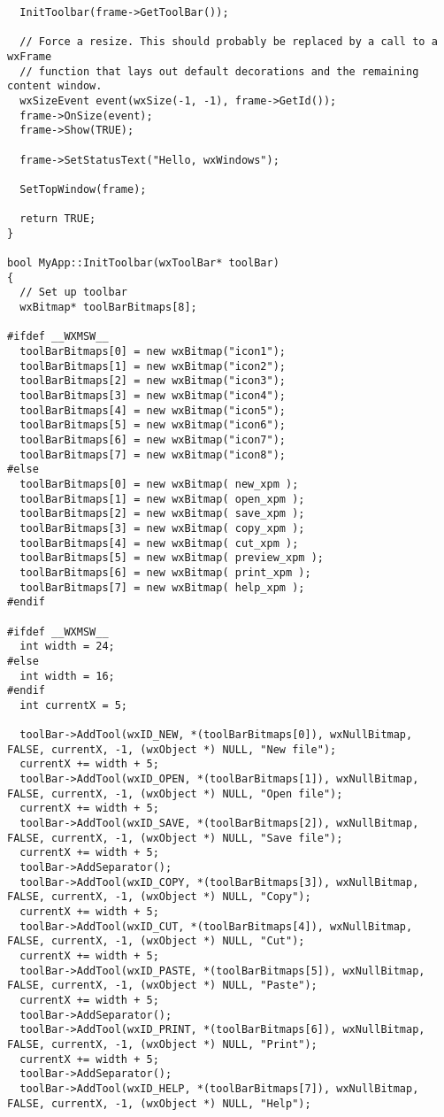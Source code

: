 {\begin{verbatim}
  InitToolbar(frame->GetToolBar());

  // Force a resize. This should probably be replaced by a call to a wxFrame
  // function that lays out default decorations and the remaining content window.
  wxSizeEvent event(wxSize(-1, -1), frame->GetId());
  frame->OnSize(event);
  frame->Show(TRUE);

  frame->SetStatusText("Hello, wxWindows");
  
  SetTopWindow(frame);

  return TRUE;
}

bool MyApp::InitToolbar(wxToolBar* toolBar)
{
  // Set up toolbar
  wxBitmap* toolBarBitmaps[8];

#ifdef __WXMSW__
  toolBarBitmaps[0] = new wxBitmap("icon1");
  toolBarBitmaps[1] = new wxBitmap("icon2");
  toolBarBitmaps[2] = new wxBitmap("icon3");
  toolBarBitmaps[3] = new wxBitmap("icon4");
  toolBarBitmaps[4] = new wxBitmap("icon5");
  toolBarBitmaps[5] = new wxBitmap("icon6");
  toolBarBitmaps[6] = new wxBitmap("icon7");
  toolBarBitmaps[7] = new wxBitmap("icon8");
#else
  toolBarBitmaps[0] = new wxBitmap( new_xpm );
  toolBarBitmaps[1] = new wxBitmap( open_xpm );
  toolBarBitmaps[2] = new wxBitmap( save_xpm );
  toolBarBitmaps[3] = new wxBitmap( copy_xpm );
  toolBarBitmaps[4] = new wxBitmap( cut_xpm );
  toolBarBitmaps[5] = new wxBitmap( preview_xpm );
  toolBarBitmaps[6] = new wxBitmap( print_xpm );
  toolBarBitmaps[7] = new wxBitmap( help_xpm );
#endif

#ifdef __WXMSW__
  int width = 24;
#else
  int width = 16;
#endif
  int currentX = 5;

  toolBar->AddTool(wxID_NEW, *(toolBarBitmaps[0]), wxNullBitmap, FALSE, currentX, -1, (wxObject *) NULL, "New file");
  currentX += width + 5;
  toolBar->AddTool(wxID_OPEN, *(toolBarBitmaps[1]), wxNullBitmap, FALSE, currentX, -1, (wxObject *) NULL, "Open file");
  currentX += width + 5;
  toolBar->AddTool(wxID_SAVE, *(toolBarBitmaps[2]), wxNullBitmap, FALSE, currentX, -1, (wxObject *) NULL, "Save file");
  currentX += width + 5;
  toolBar->AddSeparator();
  toolBar->AddTool(wxID_COPY, *(toolBarBitmaps[3]), wxNullBitmap, FALSE, currentX, -1, (wxObject *) NULL, "Copy");
  currentX += width + 5;
  toolBar->AddTool(wxID_CUT, *(toolBarBitmaps[4]), wxNullBitmap, FALSE, currentX, -1, (wxObject *) NULL, "Cut");
  currentX += width + 5;
  toolBar->AddTool(wxID_PASTE, *(toolBarBitmaps[5]), wxNullBitmap, FALSE, currentX, -1, (wxObject *) NULL, "Paste");
  currentX += width + 5;
  toolBar->AddSeparator();
  toolBar->AddTool(wxID_PRINT, *(toolBarBitmaps[6]), wxNullBitmap, FALSE, currentX, -1, (wxObject *) NULL, "Print");
  currentX += width + 5;
  toolBar->AddSeparator();
  toolBar->AddTool(wxID_HELP, *(toolBarBitmaps[7]), wxNullBitmap, FALSE, currentX, -1, (wxObject *) NULL, "Help");


\end{verbatim}}
